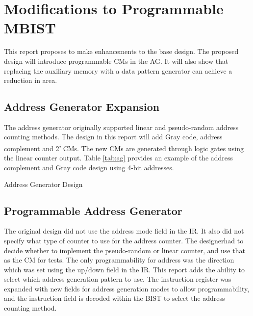 \section{Modifications to Programmable MBIST}
\label{sect:bg-modifications}
This report proposes to make enhancements to the base design.  The proposed design will introduce programmable CMs in the AG.  It will also show that replacing the auxiliary memory with a data pattern generator can achieve a reduction in area.

\subsection{Address Generator Expansion}
The address generator originally supported linear and pseudo-random address counting methods.  The design in this report will add Gray code, address complement and 2\textsuperscript{\textit{i}} CMs.  The new CMs are generated through logic gates using the linear counter output.  Table \ref{tab:ag} provides an example of the address complement and Gray code design using 4-bit addresses.

\begin{table}[H]
  \caption{Address Generator Design}
  \centering
  \label{tab:ag}
\end{table} 

\subsection{Programmable Address Generator}
The original design did not use the address mode field in the IR.  It also did not specify what type of counter to use for the address counter.  The designerhad to decide whether to implement the pseudo-random or linear counter, and use that as the CM for tests.  The only programmability for address was the direction which was set using the up/down field in the IR.  This report adds the ability to select which address generation pattern to use.  The instruction register was expanded with new fields for address generation modes to allow programmability, and the instruction field is decoded within the BIST to select the address counting method.

